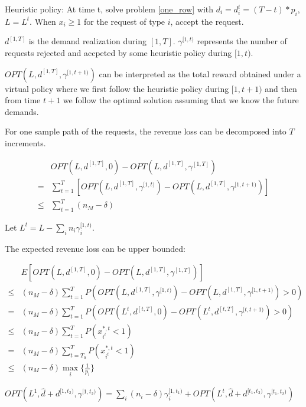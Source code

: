 Heuristic policy: At time t, solve problem \eqref{one_row} with $d_{i} = d_{i}^{t} = (T-t) * p_{i}$, $L = L^{t}$. When $x_{i}\geq 1$ for the request of type $i$, accept the request.



$d^{[1, T]}$ is the demand realization during $[1, T]$. $\gamma^{[1, t)}$ represents the number of requests rejected and accpeted by some heuristic policy during $[1, t)$. 

$OPT(L, d^{[1, T]}, \gamma^{[1,t+1)})$ can be interpreted as the total reward obtained under a virtual policy where we first follow the heuristic policy during $[1, t+1)$ and then from time $t+1$ we follow the optimal solution assuming that we know the future demands.

For one sample path of the requests, the revenue loss can be decomposed into $T$ increments.

\begin{align*}
    & OPT(L, d^{[1, T]}, 0) - OPT(L, d^{[1, T]}, \gamma^{[1, T]}) \\
 = & \sum_{t=1}^{T} [OPT(L, d^{[1,T]}, \gamma^{[1,t)}) - OPT(L, d^{[1,T]}, \gamma^{[1,t+1)})] \\
 \leq & \sum_{t=1}^{T} (n_{M} - \delta)
\end{align*}

Let $L^{t} = L-\sum_{i}n_{i} \gamma_{i}^{[1,t)}$.

The expected revenue loss can be upper bounded:

\begin{align*}
    & E[OPT(L, d^{[1, T]}, 0) - OPT(L, d^{[1, T]}, \gamma^{[1, T]})] \\
 \leq & (n_{M} - \delta) \sum_{t=1}^{T} P(OPT(L, d^{[1, T]}, \gamma^{[1,t)}) - OPT(L, d^{[1, T]}, \gamma^{[1,t+1)}) > 0) \\
 = & (n_{M} - \delta) \sum_{t=1}^{T} P(OPT(L^{t}, d^{[t, T]}, 0) - OPT(L^{t}, d^{[t, T]}, \gamma^{[t,t+1)}) > 0) \\
 \leq & (n_{M} - \delta) \sum_{t=1}^{T} P(x_{i^{t}}^{*,t} <1) \\
 = & (n_{M} - \delta) \sum_{t=T_{0}}^{T} P(x_{i^{t}}^{*,t} <1) \\
 \leq & (n_{M} - \delta) \max_{i}\{\frac{1}{p_{i}}\} 
\end{align*}


\begin{lem}
$OPT(L^{1}, \hat{d} + d^{[1, t_2)} , \gamma^{[1, t_2)}) = \sum_{i} (n_{i} - \delta) \gamma_{i}^{[1, t_1)} + OPT(L^{t}, \hat{d}+d^{[t_1, t_2)}, \gamma^{[t_1, t_2)})$
\end{lem}


